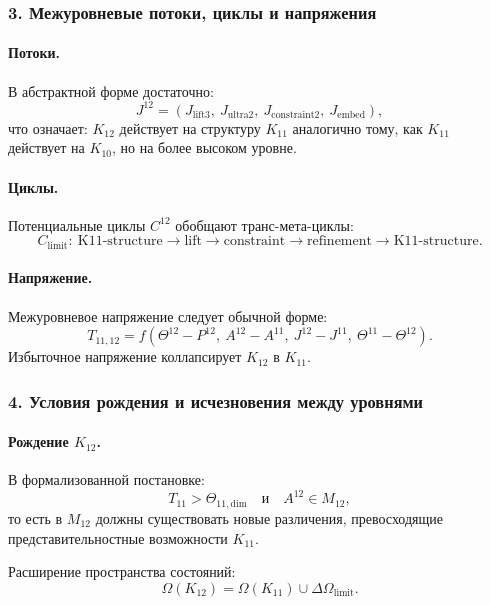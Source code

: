 \subsubsection{3. Межуровневые потоки, циклы и напряжения}

\paragraph{Потоки.}
В абстрактной форме достаточно:
\[
J^{12} = (J_{\mathrm{lift3}},\ J_{\mathrm{ultra2}},\
          J_{\mathrm{constraint2}},\ J_{\mathrm{embed}}),
\]
что означает: $K_{12}$ действует на структуру $K_{11}$ аналогично тому, как
$K_{11}$ действует на $K_{10}$, но на более высоком уровне.

\paragraph{Циклы.}
Потенциальные циклы $C^{12}$ обобщают транс-мета-циклы:
\[
C_{\mathrm{limit}}:\
\text{K11-structure} \rightarrow \text{lift} \rightarrow
\text{constraint} \rightarrow \text{refinement} \rightarrow \text{K11-structure}.
\]

\paragraph{Напряжение.}
Межуровневое напряжение следует обычной форме:
\[
T_{11,12} =
f(\Theta^{12} - P^{12},\ A^{12} - A^{11},\
  J^{12} - J^{11},\ \Theta^{11} - \Theta^{12}).
\]
Избыточное напряжение коллапсирует $K_{12}$ в $K_{11}$.

\subsubsection{4. Условия рождения и исчезновения между уровнями}

\paragraph{Рождение $K_{12}$.}
В формализованной постановке:
\[
T_{11} > \Theta_{11,\mathrm{dim}}
\quad\text{и}\quad
A^{12} \in M_{12},
\]
то есть в $M_{12}$ должны существовать новые различения, превосходящие
представительностные возможности $K_{11}$.

Расширение пространства состояний:
\[
\Omega(K_{12}) = \Omega(K_{11}) \cup \Delta\Omega_{\mathrm{limit}}.
\]

